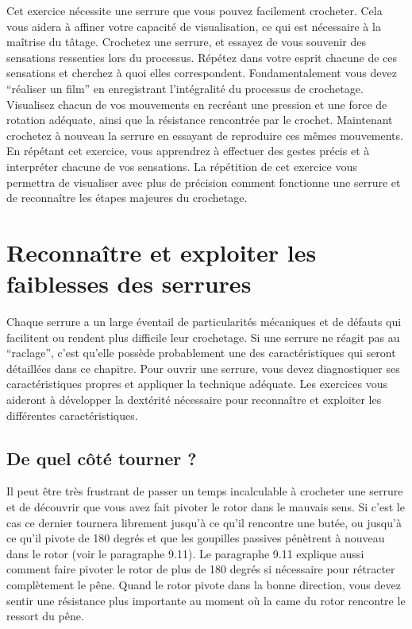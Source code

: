 \documentclass[a4paper,french,11pt,twoside]{report}
\begin{document}
Cet exercice nécessite une serrure que vous pouvez facilement crocheter. Cela vous aidera à affiner votre capacité de visualisation, ce qui est nécessaire à la maîtrise du tâtage. Crochetez une serrure, et essayez de vous souvenir des sensations ressenties lors du processus. Répétez dans votre esprit chacune de ces sensations et cherchez à quoi elles correspondent. Fondamentalement vous devez \enquote{réaliser un film} en enregistrant l'intégralité du processus de crochetage. Visualisez chacun de vos mouvements en recréant une pression et une force de rotation adéquate, ainsi que la résistance rencontrée par le crochet. Maintenant crochetez à nouveau la serrure en essayant de reproduire ces mêmes mouvements.
En répétant cet exercice, vous apprendrez à effectuer des gestes précis et à interpréter chacune de vos sensations. La répétition de cet exercice vous permettra de visualiser avec plus de précision comment fonctionne une serrure et de reconnaître les étapes majeures du crochetage.


\chapter{\label{chap:faiblesses_serrure}Reconnaître et exploiter les faiblesses des serrures}

Chaque serrure a un large éventail de particularités mécaniques et de défauts qui facilitent ou rendent plus difficile leur crochetage. Si une serrure ne réagit pas au \enquote{raclage}, c'est qu'elle possède probablement une des caractéristiques qui seront détaillées dans ce chapitre. Pour ouvrir une serrure, vous devez diagnostiquer ses caractéristiques propres et appliquer la technique adéquate. Les exercices vous aideront à développer la dextérité nécessaire pour reconnaître et exploiter les différentes caractéristiques.

\section{De quel côté tourner ?}

Il peut être très frustrant de passer un temps incalculable à crocheter une serrure et de découvrir que vous avez fait pivoter le rotor dans le mauvais sens. Si c'est le cas ce dernier tournera librement jusqu'à ce qu'il rencontre une butée, ou jusqu'à ce qu'il pivote de 180 degrés et que les goupilles passives pénètrent à nouveau dans le rotor (voir le paragraphe 9.11). Le paragraphe 9.11 explique aussi comment faire pivoter le rotor de plus de 180 degrés si nécessaire pour rétracter complètement le pêne. Quand le rotor pivote dans la bonne direction, vous devez sentir une résistance plus importante au moment où la came du rotor rencontre le ressort du pêne.
\end{document}
